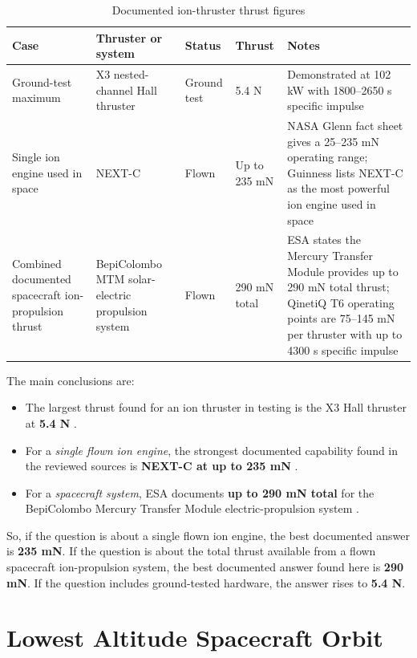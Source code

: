 \documentclass[11pt]{article}
\begin{document}
\begin{table}[h!]
\centering
\caption{Documented ion-thruster thrust figures}
\label{tab:thrust}
\begin{tabular}{p{3.0cm} p{4.2cm} p{2.0cm} p{2.2cm} p{3.1cm}}
\toprule
Case & Thruster or system & Status & Thrust & Notes \\
\midrule
Ground-test maximum & X3 nested-channel Hall thruster & Ground test & 5.4 N & Demonstrated at 102 kW with 1800--2650 s specific impulse \cite{hall2021,peplx3} \\
Single ion engine used in space & NEXT-C & Flown & Up to 235 mN & NASA Glenn fact sheet gives a 25--235 mN operating range; Guinness lists NEXT-C as the most powerful ion engine used in space \cite{nextc,nextcgwr} \\
Combined documented spacecraft ion-propulsion thrust & BepiColombo MTM solar-electric propulsion system & Flown & 290 mN total & ESA states the Mercury Transfer Module provides up to 290 mN total thrust; QinetiQ T6 operating points are 75--145 mN per thruster with up to 4300 s specific impulse \cite{bepifact,esaops,t6eval} \\
\bottomrule
\end{tabular}
\end{table}

The main conclusions are:

\begin{itemize}
    \item The largest thrust found for an ion thruster in testing is the X3 Hall thruster at \textbf{5.4 N} \cite{hall2021,peplx3}.
    \item For a \emph{single flown ion engine}, the strongest documented capability found in the reviewed sources is \textbf{NEXT-C at up to 235 mN} \cite{nextc,nextcgwr}.
    \item For a \emph{spacecraft system}, ESA documents \textbf{up to 290 mN total} for the BepiColombo Mercury Transfer Module electric-propulsion system \cite{bepifact,esaops}.
\end{itemize}

So, if the question is about a single flown ion engine, the best documented answer is \textbf{235 mN}. If the question is about the total thrust available from a flown spacecraft ion-propulsion system, the best documented answer found here is \textbf{290 mN}. If the question includes ground-tested hardware, the answer rises to \textbf{5.4 N}.

\section{Lowest Altitude Spacecraft Orbit}
\end{document}
